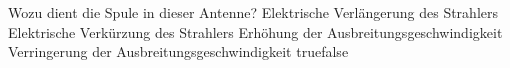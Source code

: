     {Wozu dient die Spule in dieser Antenne?}
    {Elektrische Verlängerung des Strahlers}
    {Elektrische Verkürzung des Strahlers}
    {Erhöhung der Ausbreitungsgeschwindigkeit}
    {Verringerung der Ausbreitungsgeschwindigkeit}
    {true}{false}